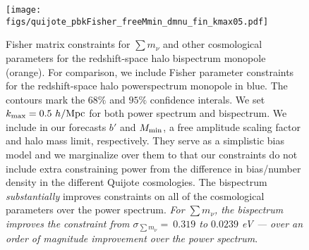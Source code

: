 \documentclass[12pt, letterpaper, preprint]{aastex62}
\newcommand{\smnu}{\sum m_\nu}
\begin{document}
\begin{figure}
\begin{center}
    \texttt{[image: figs/quijote\_pbkFisher\_freeMmin\_dmnu\_fin\_kmax05.pdf]}
    \caption{Fisher matrix constraints for $\smnu$ and other cosmological parameters 
    for the redshift-space halo bispectrum monopole (orange). For comparison, we 
    include Fisher parameter constraints for the redshift-space halo powerspectrum monopole 
    in blue. The contours mark the $68\%$ and $95\%$ confidence interals. We set 
    $k_{\rm max} = 0.5~h/{\rm Mpc}$ for both power spectrum and bispectrum. We 
    include in our forecasts $b'$ and $M_{\rm min}$, a free amplitude scaling factor
    and halo mass limit, respectively. They serve as a simplistic bias model and we 
    marginalize over them to that our constraints do not include extra constraining 
    power from the difference in bias/number density in the different Quijote cosmologies.
    The bispectrum {\em substantially} improves constraints on all of the cosmological parameters 
    over the power spectrum. {\em For $\smnu$, the bispectrum improves the constraint
    from $\sigma_{\smnu}{=}~0.319$ to $0.0239$ eV --- over an order of magnitude 
    improvement over the power spectrum}.}
\label{fig:bk_fish}
\end{center}
\end{figure}
\end{document}
